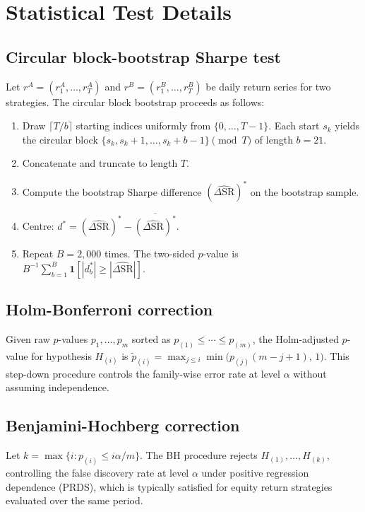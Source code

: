 \documentclass[a4paper,12pt]{report}
\begin{document}
\chapter{Statistical Test Details}
\label{app:stats}

\section{Circular block-bootstrap Sharpe test}

Let $r^A = (r_1^A,\ldots,r_T^A)$ and $r^B = (r_1^B,\ldots,r_T^B)$ be
daily return series for two strategies. The circular block bootstrap
\citep{ledoitwolf2008} proceeds as follows:
\begin{enumerate}
  \item Draw $\lceil T/b \rceil$ starting indices uniformly from
        $\{0,\ldots,T-1\}$. Each start $s_k$ yields the circular block
        $\{s_k, s_k{+}1,\ldots,s_k{+}b{-}1\}\pmod{T}$ of length $b = 21$.
  \item Concatenate and truncate to length $T$.
  \item Compute the bootstrap Sharpe difference
        $(\widehat{\Delta\mathrm{SR}})^*$ on the bootstrap sample.
  \item Centre: $d^* = (\widehat{\Delta\mathrm{SR}})^*
        - \overline{(\widehat{\Delta\mathrm{SR}})^*}$.
  \item Repeat $B = 2{,}000$ times. The two-sided $p$-value is
        $B^{-1}\sum_{b=1}^B \mathbf{1}[|d_b^*| \geq |\widehat{\Delta\mathrm{SR}}|]$.
\end{enumerate}

\section{Holm-Bonferroni correction}

Given raw $p$-values $p_1,\ldots,p_m$ sorted as $p_{(1)} \leq \cdots \leq
p_{(m)}$, the Holm-adjusted $p$-value for hypothesis $H_{(i)}$ is
$\tilde{p}_{(i)} = \max_{j \leq i}\min\bigl(p_{(j)}(m-j+1),\,1\bigr)$.
This step-down procedure controls the family-wise error rate at level
$\alpha$ without assuming independence.

\section{Benjamini-Hochberg correction}

Let $k = \max\{i : p_{(i)} \leq i\alpha/m\}$. The BH procedure rejects
$H_{(1)},\ldots,H_{(k)}$, controlling the false discovery rate at level
$\alpha$ under positive regression dependence (PRDS), which is typically
satisfied for equity return strategies evaluated over the same period.
\end{document}
